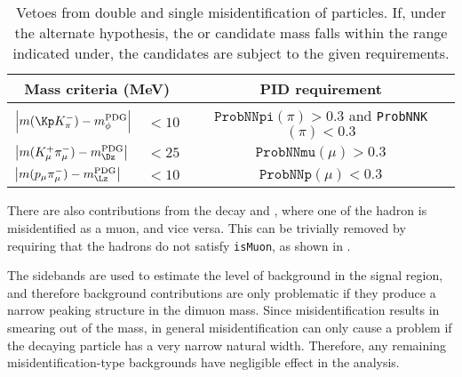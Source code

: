 \begin{table}
  \caption{
   Vetoes from double and single misidentification of particles.
   If, under the alternate hypothesis, the \db or \Kstarz candidate mass falls within the range
   indicated under, the candidates are subject to the given \pid requirements.
  }
  \label{tab:bkg:vetoes}
  \begin{center}
    \begin{tabular}{lcc}\toprule
      \multicolumn{2}{c}{Mass criteria (MeV)} & PID requirement \\\midrule
      $\left|m(\Kp K^-_\pi) - m^\mathrm{PDG}_\phi\right|$ & $<10$
      & $\mathtt{ProbNNpi}(\pi)>0.3$ and {\tt ProbNNK$(\pi)<0.3$}
      \\\rule{0pt}{3ex}$\left|m(K^+_\mu\pi^-_\mu) - m^\mathrm{PDG}_{\Dz}\right|$& $<25$
      & $\mathtt{ProbNNmu}(\mu)>0.3$
      \\\rule{0pt}{3ex}$\left|m(p_\mu\pi^-_\mu) - m^\mathrm{PDG}_{\Lz}\right|$ & $<10$
      & $\mathtt{ProbNNp}(\mu)<0.3$  \\
      \bottomrule
    \end{tabular}
  \end{center}
\end{table}

There are also contributions from the decay \decay{\Bd}{\jpsi\Kstarz} and \decay{\jpsi}{\mumu},
where one of the hadron is misidentified as a muon, and vice versa.
This can be trivially removed by requiring that the hadrons do not satisfy {\tt isMuon}, as shown
in .


The sidebands are used to estimate the level of background in the signal region, and therefore
background
contributions are only problematic if they produce a narrow peaking structure in the dimuon mass.
Since misidentification results in smearing out of the mass, in general misidentification can only
cause a problem if the decaying particle has a very narrow natural width.
Therefore, any remaining misidentification-type backgrounds have negligible effect in the analysis.



